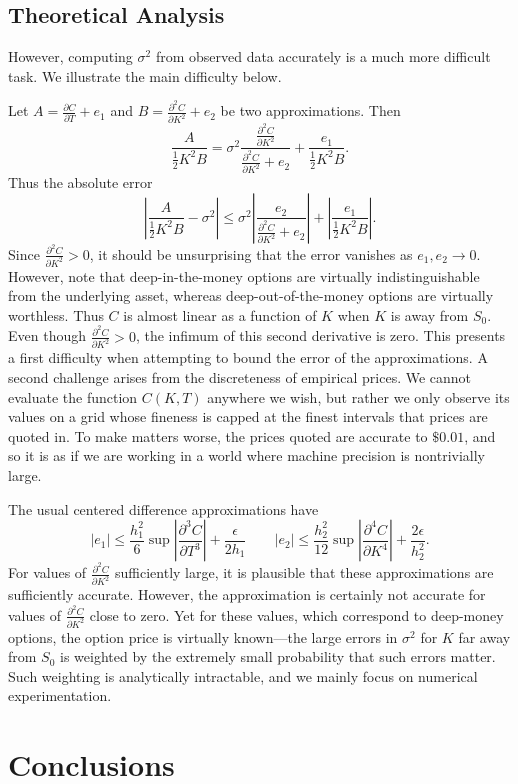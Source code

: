\documentclass[12pt]{article}
\numberwithin{equation}{section}
\newcommand{\diff}[2]{\frac{\partial #1}{\partial #2}}
\newcommand{\abs}[1]{\left|#1\right|}
\begin{document}
\subsection{Theoretical Analysis}
However, computing $\sigma^2$ from observed data accurately is a much more difficult task. We illustrate the main difficulty below.

Let $A = \diff{C}{T} + e_1$ and $B = \diff{^2C}{K^2} + e_2$ be two approximations. Then \[
\frac{A}{\frac{1}{2}K^2 B} = \sigma^2 \frac{\diff{^2C}{K^2}}{\diff{^2C}{K^2} + e_2} + \frac{e_1}{\frac{1}{2}K^2 B}.
\]
Thus the absolute error \[
\abs{\frac{A}{\frac{1}{2}K^2 B} - \sigma^2} \le \sigma^2 \abs{\frac{e_2}{\diff{^2C}{K^2}+e_2}} + \abs{\frac{e_1}{\frac{1}{2}K^2B}}.
\]
Since $\diff{^2C}{K^2} > 0$, it should be unsurprising that the error vanishes as $e_1,e_2 \to 0$. However, note that deep-in-the-money options are virtually indistinguishable from the underlying asset, whereas deep-out-of-the-money options are virtually worthless. Thus $C$ is almost linear as a function of $K$ when $K$ is away from $S_0$.
Even though $\diff{^2C}{K^2} > 0$, the infimum of this second derivative is zero. This presents a first difficulty when attempting to bound the error of the approximations. A second challenge arises from the discreteness of empirical prices. We cannot evaluate the function $C(K,T)$ anywhere we wish, but rather we only observe its values on a grid whose fineness is capped at the finest intervals that prices are quoted in. To make matters worse, the prices quoted are accurate to $\$0.01$, and so it is as if we are working in a world where machine precision is nontrivially large.


The usual centered difference approximations have \[
|e_1|\le \frac{h_1^2}{6}\sup \abs{\diff{^3C}{T^3}} + \frac{\epsilon}{2h_1} \qquad |e_2| \le \frac{h_2^2}{12}\sup \abs{\diff{^4C}{K^4}} + \frac{2\epsilon}{h_2^2}.
\]
For values of $\diff{^2C}{K^2}$ sufficiently large, it is plausible that these approximations are sufficiently accurate. However, the approximation is certainly not accurate for values of $\diff{^2C}{K^2}$ close to zero. Yet for these values, which correspond to deep-money options, the option price is virtually known---the large errors in $\sigma^2$ for $K$ far away from $S_0$ is weighted by the extremely small probability that such errors matter. Such weighting is analytically intractable, and we mainly focus on numerical experimentation. 



\section{Conclusions}
\end{document}
